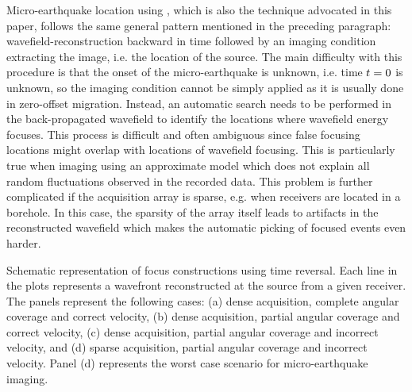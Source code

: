 Micro-earthquake location using 
, which is also the technique advocated in
this paper, follows the same general pattern mentioned in the
preceding paragraph: wavefield-reconstruction backward in time
followed by an imaging condition extracting the image, i.e. the
location of the source. The main difficulty with this procedure is
that the onset of the micro-earthquake is unknown, i.e. time ${t}=0$
is unknown, so the imaging condition cannot be simply applied as it is
usually done in zero-offset migration. Instead, an automatic search
needs to be performed in the back-propagated wavefield to identify the
locations where wavefield energy focuses. This process is difficult
and often ambiguous since false focusing locations might overlap with
locations of wavefield focusing. This is particularly true when
imaging using an approximate model which does not explain all random
fluctuations observed in the recorded data. This problem is further
complicated if the acquisition array is sparse, e.g. when receivers
are located in a borehole. In this case, the sparsity of the array
itself leads to artifacts in the reconstructed wavefield which makes
the automatic picking of focused events even harder.

{Schematic representation of focus constructions using time
  reversal. Each line in the plots represents a wavefront
  reconstructed at the source from a given receiver. The panels
  represent the following cases: (a) dense acquisition, complete
  angular coverage and correct velocity, (b) dense acquisition,
  partial angular coverage and correct velocity, (c) dense
  acquisition, partial angular coverage and incorrect velocity, and
  (d) sparse acquisition, partial angular coverage and incorrect
  velocity. Panel (d) represents the worst case scenario for
  micro-earthquake imaging.}

